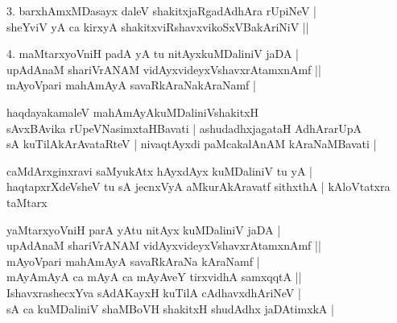 \begin{entry}
\begin{shl}
3. barxhAmxMDasayx daleV shakitxjaRgadAdhAra rUpiNeV |\\
sheYviV yA ca kirxyA shakitxviRshavxvikoSxVBakAriNiV ||
\end{shl}
\smallskip
{}
\smallskip
\begin{shl}
4. maMtarxyoVniH padA yA tu nitAyxkuMDaliniV jaDA |\\
upAdAnaM shariVrANAM vidAyxvideyxVshavxrAtamxnAmf ||\\
mAyoVpari mahAmAyA savaRkAraNakAraNamf |
\end{shl}
\smallskip
{}
\smallskip
\begin{shl}
haqdayakamaleV mahAmAyAkuMDaliniVshakitxH\\
sAvxBAvika rUpeVNasimxtaHBavati | ashudadhxjagataH AdhArarUpA\\
sA kuTilAkArAvataRteV | nivaqtAyxdi paMcakalAnAM kAraNaMBavati |
\end{shl}
\smallskip
\begin{shl}
caMdArxginxravi saMyukAtx hAyxdAyx kuMDaliniV tu yA |\\
haqtapxrXdeVsheV tu sA jecnxVyA aMkurAkAravatf sithxthA | kAloVtatxra taMtarx
\end{shl}
\smallskip
\begin{shl}
yaMtarxyoVniH parA yAtu nitAyx kuMDaliniV jaDA |\\
upAdAnaM shariVrANAM vidAyxvideyxVshavxrAtamxnAmf ||\\
mAyoVpari mahAmAyA savaRkAraNa kAraNamf |\\
mAyAmAyA ca mAyA ca mAyAveY tirxvidhA samxqqtA ||\\
IshavxrashecxYva sAdAKayxH kuTilA cAdhavxdhAriNeV |\\
sA ca kuMDaliniV shaMBoVH shakitxH shudAdhx jaDAtimxkA |
\end{shl}
\smallskip
{}
\end{entry}

